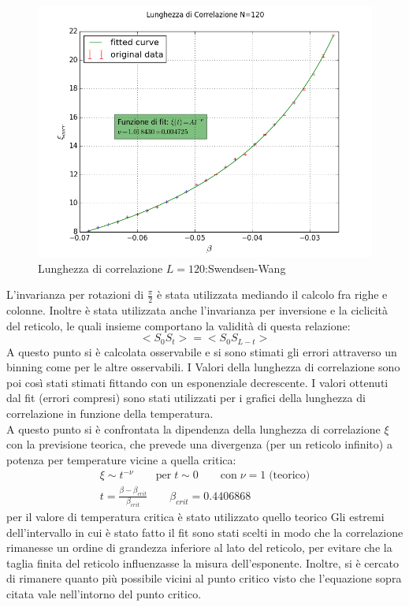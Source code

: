 \begin{figure}[h]
\centering
	\includegraphics[scale=0.5]{sw/corrN120.png}
\caption{Lunghezza di correlazione $L=120$:Swendsen-Wang}
\end{figure}
L'invarianza per rotazioni di $\frac{\pi}{2}$ è stata utilizzata mediando il calcolo fra righe e colonne. Inoltre è stata utilizzata anche l'invarianza per inversione  e la ciclicità del reticolo, le quali insieme comportano la validità di questa relazione:
$$
	< S_0 S_t> = < S_0 S_{L-t}>
$$
A questo punto si è calcolata osservabile e si sono stimati gli errori attraverso un binning come per le altre osservabili.
I Valori della lunghezza di correlazione sono poi così stati stimati fittando con un esponenziale decrescente. I valori ottenuti dal fit (errori compresi) sono stati utilizzati per i grafici della lunghezza di correlazione in funzione della temperatura.\\
A questo punto si è confrontata la dipendenza della lunghezza di correlazione $\xi$ con la previsione teorica, che prevede una divergenza (per un reticolo infinito) a potenza per temperature vicine a quella critica:
\begin{align*}
	\xi \sim t^{-\nu} \qquad \mbox{per} \; t \sim 0 \qquad \mbox{con} \; \nu = 1 \; \mbox{(teorico)}  \\
	t = \frac{\beta - \beta_{crit}}{\beta_{crit}} \qquad \beta_{crit} = 0.4406868
\end{align*}
per il valore di temperatura critica è stato utilizzato quello teorico
Gli estremi dell'intervallo in cui è stato fatto il fit sono stati scelti in modo che la correlazione rimanesse un ordine di grandezza inferiore al lato del reticolo, per evitare che la taglia finita del reticolo influenzasse la misura dell'esponente. Inoltre, si è cercato di rimanere quanto più possibile vicini al punto critico visto che l'equazione sopra citata vale nell'intorno del punto critico.\\
